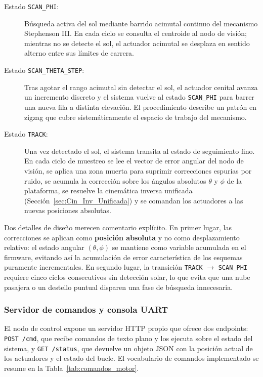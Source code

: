 \begin{description}
	\item[Estado \texttt{SCAN\_PHI}:] Búsqueda activa del sol mediante barrido acimutal continuo del mecanismo Stephenson III. En cada ciclo se consulta el centroide al nodo de visión; mientras no se detecte el sol, el actuador acimutal se desplaza en sentido alterno entre sus límites de carrera.
	
	\item[Estado \texttt{SCAN\_THETA\_STEP}:] Tras agotar el rango acimutal sin detectar el sol, el actuador cenital avanza un incremento discreto y el sistema vuelve al estado \texttt{SCAN\_PHI} para barrer una nueva fila a distinta elevación. El procedimiento describe un patrón en zigzag que cubre sistemáticamente el espacio de trabajo del mecanismo.
	
	\item[Estado \texttt{TRACK}:] Una vez detectado el sol, el sistema transita al estado de seguimiento fino. En cada ciclo de muestreo se lee el vector de error angular del nodo de visión, se aplica una zona muerta para suprimir correcciones espurias por ruido, se acumula la corrección sobre los ángulos absolutos $\theta$ y $\phi$ de la plataforma, se resuelve la cinemática inversa unificada (Sección~\ref{sec:Cin_Inv_Unificada}) y se comandan los actuadores a las nuevas posiciones absolutas.
\end{description}

Dos detalles de diseño merecen comentario explícito. En primer lugar, las correcciones se aplican como \textbf{posición absoluta} y no como desplazamiento relativo: el estado angular $(\theta, \phi)$ se mantiene como variable acumulada en el firmware, evitando así la acumulación de error característica de los esquemas puramente incrementales. En segundo lugar, la transición \texttt{TRACK} $\rightarrow$ \texttt{SCAN\_PHI} requiere cinco ciclos consecutivos sin detección solar, lo que evita que una nube pasajera o un destello puntual disparen una fase de búsqueda innecesaria.

\subsubsection{Servidor de comandos y consola UART}
El nodo de control expone un servidor HTTP propio que ofrece dos endpoints: \texttt{POST /cmd}, que recibe comandos de texto plano y los ejecuta sobre el estado del sistema, y \texttt{GET /status}, que devuelve un objeto JSON con la posición actual de los actuadores y el estado del bucle. El vocabulario de comandos implementado se resume en la Tabla~\ref{tab:comandos_motor}.

